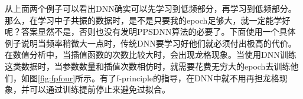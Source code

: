 从上面两个例子可以看出DNN确实可以先学习到低频部分，再学习到低频部分。那么，在学习中子共振的数据时，是不是只要我的epoch足够大，就一定能学好呢？答案显然不是，否则也没有发明PPSDNN算法的必要了。下面使用一个具体例子说明当频率稍微大一点时，传统DNN要学习好他们就必须付出极高的代价。在数值分析中，当插值函数的次数比较大时，会出现龙格现象。当使用DNN训练这类数据时，当参数数量和插值次数相仿时，就需要花费无穷大的epoch去训练他们，如图\ref{fig:fpfour}\cite{xu2019frequency}所示。有了f-principle的指导，在DNN中就不用再担龙格现象，并可以通过训练提前停止来避免过拟合。
\begin{figure}[htbp!]
    \centering

\end{figure}

